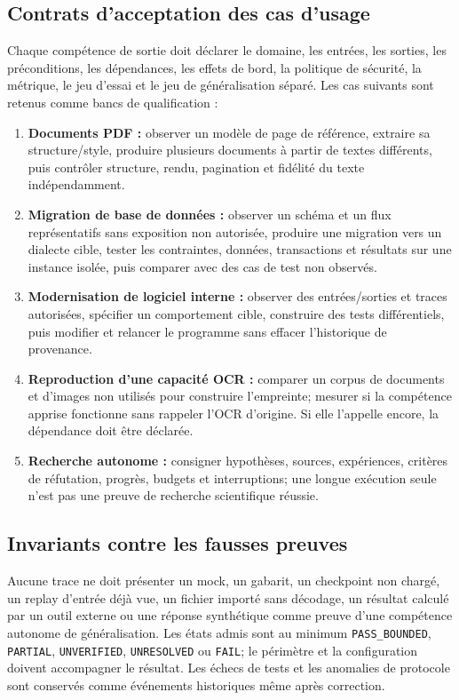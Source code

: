 \subsection{Contrats d'acceptation des cas d'usage}
Chaque compétence de sortie doit déclarer le domaine, les entrées, les sorties, les préconditions, les dépendances, les effets de bord, la politique de sécurité, la métrique, le jeu d'essai et le jeu de généralisation séparé. Les cas suivants sont retenus comme bancs de qualification :
\begin{enumerate}
 \item \textbf{Documents PDF :} observer un modèle de page de référence, extraire sa structure/style, produire plusieurs documents à partir de textes différents, puis contrôler structure, rendu, pagination et fidélité du texte indépendamment.
 \item \textbf{Migration de base de données :} observer un schéma et un flux représentatifs sans exposition non autorisée, produire une migration vers un dialecte cible, tester les contraintes, données, transactions et résultats sur une instance isolée, puis comparer avec des cas de test non observés.
 \item \textbf{Modernisation de logiciel interne :} observer des entrées/sorties et traces autorisées, spécifier un comportement cible, construire des tests différentiels, puis modifier et relancer le programme sans effacer l'historique de provenance.
 \item \textbf{Reproduction d'une capacité OCR :} comparer un corpus de documents et d'images non utilisés pour construire l'empreinte; mesurer si la compétence apprise fonctionne sans rappeler l'OCR d'origine. Si elle l'appelle encore, la dépendance doit être déclarée.
 \item \textbf{Recherche autonome :} consigner hypothèses, sources, expériences, critères de réfutation, progrès, budgets et interruptions; une longue exécution seule n'est pas une preuve de recherche scientifique réussie.
\end{enumerate}

\subsection{Invariants contre les fausses preuves}
Aucune trace ne doit présenter un mock, un gabarit, un checkpoint non chargé, un replay d'entrée déjà vue, un fichier importé sans décodage, un résultat calculé par un outil externe ou une réponse synthétique comme preuve d'une compétence autonome de généralisation. Les états admis sont au minimum \texttt{PASS\_BOUNDED}, \texttt{PARTIAL}, \texttt{UNVERIFIED}, \texttt{UNRESOLVED} ou \texttt{FAIL}; le périmètre et la configuration doivent accompagner le résultat. Les échecs de tests et les anomalies de protocole sont conservés comme événements historiques même après correction.
